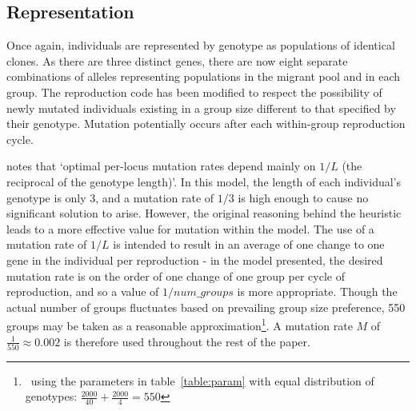 \documentclass[11pt]{article}
\begin{document}

\subsection{Representation}
Once again, individuals are represented by genotype as populations of identical clones. As there are three distinct genes, there are now eight separate combinations of alleles representing populations in the migrant pool and in each group. The reproduction code has been modified to respect the possibility of newly mutated individuals existing in a group size different to that specified by their genotype. Mutation potentially occurs after each within-group reproduction cycle.

\citet{optimal} notes that `optimal per-locus mutation rates depend mainly on $1/L$ (the reciprocal of the genotype length)'. In this model, the length of each individual's genotype is only 3, and a mutation rate of $1/3$ is high enough to cause no significant solution to arise. %
However, the original reasoning behind the heuristic leads to a more effective value for mutation within the model. The use of a mutation rate of $1/L$ is intended to result in an average of one change to one gene in the individual per reproduction - in the model presented, the desired mutation rate is on the order of one change of one group per cycle of reproduction, and so a value of $1/num\_groups$ is more appropriate. Though the actual number of groups fluctuates based on prevailing group size preference, 550 groups may be taken as a reasonable approximation\footnote{~using the parameters in table~\ref{table:param} with equal distribution of genotypes: $\frac{2000}{40} + \frac{2000}{4} = 550$}. A mutation rate $M$ of $\frac{1}{550} \approx 0.002$ is therefore used throughout the rest of the paper.
\end{document}
